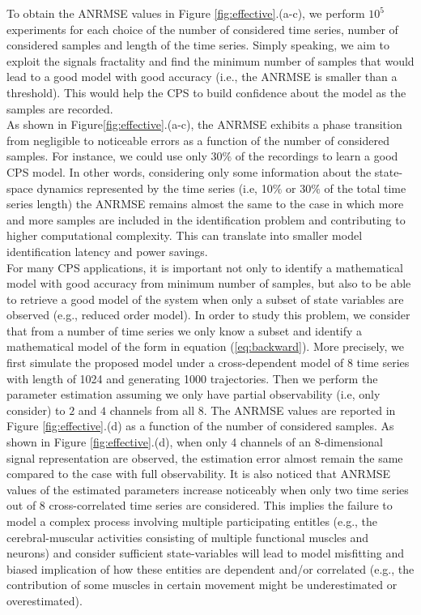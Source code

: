  To obtain the ANRMSE values in Figure \ref{fig:effective}.(a-c), we perform $10^{5}$ experiments for each choice of the number of considered time series, number of considered samples and length of the time series. Simply speaking, we aim to exploit the signals fractality and find the minimum number of samples that would lead to a good model with good accuracy (i.e., the ANRMSE is smaller than a threshold). This would help the CPS to build confidence about the model as the samples are recorded. \\ 
\indent As shown in Figure\ref{fig:effective}.(a-c), the ANRMSE exhibits a phase transition from negligible to noticeable errors as a function of the number of considered samples. For instance, we could use only 30$\%$ of the recordings to learn a good CPS model. In other words, considering only some information about the state-space dynamics represented by the time series (i.e, 10$\%$ or 30$\%$ of the total time series length) the ANRMSE remains almost the same to the case in which more and more samples are included in the identification problem and contributing to higher computational complexity. This can translate into smaller model identification latency and power savings. \\
\indent For many CPS applications, it is important not only to identify a mathematical model with good accuracy from minimum number of samples, but also to be able to retrieve a good model of the system when only a subset of state variables are observed (e.g., reduced order model). In order to study this problem, we consider that from a number of time series  we only know a subset and identify a mathematical model of the form in equation (\ref{eq:backward}). More precisely, we first simulate the proposed model under a cross-dependent model of 8 time series with length of 1024 and generating 1000 trajectories. Then we perform the parameter estimation assuming we only have partial observability (i.e, only consider) to $2$ and $4$ channels from all 8. The ANRMSE values  are reported  in Figure \ref{fig:effective}.(d) as a function of the number of considered samples. As shown in Figure \ref{fig:effective}.(d), when only 4 channels of an 8-dimensional signal representation are observed, the estimation error almost remain the same compared to the case with full observability. It is also noticed that ANRMSE values of the estimated parameters increase noticeably when only two time series out of 8 cross-correlated time series are considered. This implies the failure to model a complex process involving multiple participating entitles (e.g., the cerebral-muscular activities consisting of multiple functional muscles and neurons) and consider sufficient state-variables will lead to model misfitting and biased implication of how these entities are dependent and/or correlated (e.g., the contribution of some muscles in certain movement might be underestimated or overestimated).  
